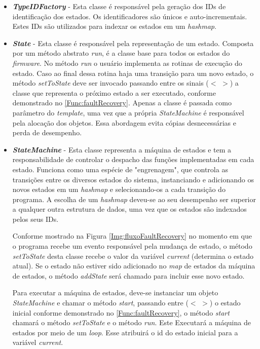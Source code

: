 \begin{itemize}
	\item \textit{\textbf{TypeIDFactory}} - Esta classe é responsável pela geração dos IDs de identificação dos estados. Os identificadores são únicos e auto-incrementais. Estes IDs são utilizados para indexar os estados em um \textit{hashmap}.
	
	\item \textit{\textbf{State}} - Esta classe é responsável pela representação de um estado. Composta por um método abstrato \textit{run}, é a classe base para todos os estados do \textit{firmware}. No método \textit{run} o usuário implementa as rotinas de execução do estado. Caso ao final dessa rotina haja uma transição para um novo estado, o método \textit{setToState} deve ser invocado passando entre os sinais ($<$ $>$) a classe que representa o próximo estado a ser executado, conforme demonstrado no \autoref{Func:faultRecovery}. Apenas a classe é passada como parâmetro do \textit{template}, uma vez que a própria  \textit{StateMachine} é responsável pela alocação dos objetos. Essa abordagem evita cópias desnecessárias e perda de desempenho.
	
	\item \textit{\textbf{StateMachine}} - Esta classe representa a máquina de estados e tem a responsabilidade de controlar o despacho das funções implementadas em cada estado. Funciona como uma espécie de "engrenagem", que controla as transições entre os diversos estados do sistema, instanciando e adicionando os novos estados em um \textit{hashmap} e selecionando-os a cada transição do programa. A escolha de um \textit{hashmap} deveu-se ao seu desempenho ser superior a qualquer outra estrutura de dados, uma vez que os estados são indexados pelos seus IDs.
	
	Conforme mostrado na Figura \ref{Img:fluxoFaultRecovery} no momento em que o programa recebe um evento responsável pela mudança de estado, o método \textit{setToState} desta classe recebe o valor da variável \textit{current} (determina o estado atual). Se o estado não estiver sido adicionado no \textit{map} de estados da máquina de estados, o método \textit{addState} será chamado para incluir esse novo estado.
	
	 Para executar a máquina de estados, deve-se instanciar um objeto \textit{StateMachine} e chamar o método \textit{start}, passando entre ($<$ $>$) o estado inicial conforme demonstrado no \autoref{Func:faultRecovery}, o método \textit{start} chamará o método \textit{setToState} e o método \textit{run}. Este Executará a máquina de estados por meio de um \textit{loop}. Esse atribuirá o id do estado inicial para a variável \textit{current}.
		
\end{itemize}

